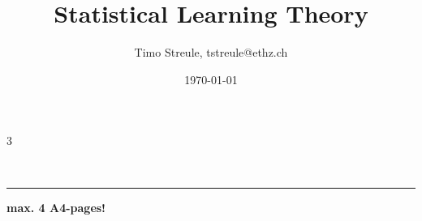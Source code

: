 \documentclass[%
    ,a4paper
    ,fontsize=12pt %
    ,landscape
    ,pagesize
    ,headinclude
    ]{scrartcl}
\title{Statistical Learning Theory}
\author{Timo Streule, tstreule@ethz.ch}
\date{\today}
\begin{document}
    

    \begin{multicols*}{3}


        \maketitle

        
        
        
        
        
        
        
        
        
%
%        

        ~\vfill\parbox{\linewidth}{\hrule\medskip\hrulefill\centering\textbf{ max. 4 A4-pages! }\hrulefill}

    \end{multicols*}
\end{document}
